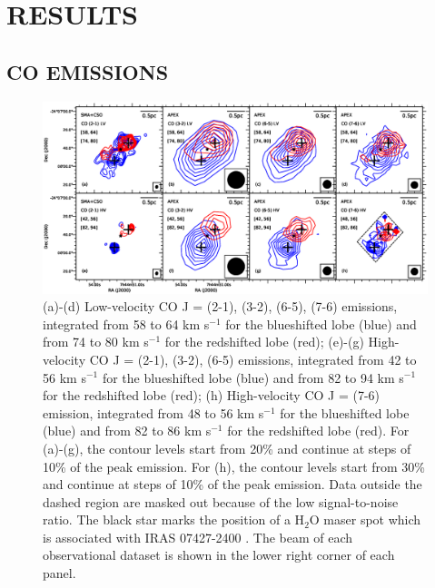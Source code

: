 \section{RESULTS}
\subsection{CO EMISSIONS}

\begin{figure}[htbp]
\includegraphics[scale=.60]{./fig/ori_contourall.eps}
\caption{(a)-(d) Low-velocity CO J = (2-1), (3-2), (6-5), (7-6) emissions, integrated from 58 to 64 km s$^{-1} $ for the blueshifted lobe (blue) and from 74 to 80 km s$^{-1}$ for the redshifted lobe (red); (e)-(g) High-velocity CO J = (2-1), (3-2), (6-5) emissions,  integrated from 42 to 56 km s$^{-1} $ for the blueshifted lobe (blue) and from 82 to 94 km s$^{-1}$ for the redshifted lobe (red); (h) High-velocity CO J = (7-6) emission, integrated from 48 to 56 km s$^{-1} $ for the blueshifted lobe (blue) and from 82 to 86 km s$^{-1}$ for the redshifted lobe (red). For (a)-(g), the contour levels start from 20\% and continue at steps of 10\% of the peak emission. For (h), the contour levels start from 30\% and continue at steps of 10\% of the peak emission. Data outside the dashed region are masked out because of the low signal-to-noise ratio. The black star marks the position of a H$_2$O maser spot which is associated with IRAS 07427-2400 \citep{2015PASJ...67...69S}. The beam of each observational dataset is shown in the lower right corner of each panel. \label{fig1}}
\end{figure}


